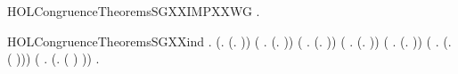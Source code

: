 \begin{SaveVerbatim}{HOLCongruenceTheoremsSGXXIMPXXWG}
\HOLTokenTurnstile{} \HOLSymConst{\HOLTokenForall{}}.   \HOLSymConst{\HOLTokenImp{}}  
\end{SaveVerbatim}
\newcommand{\HOLCongruenceTheoremsSGXXIMPXXWG}{\UseVerbatim{HOLCongruenceTheoremsSGXXIMPXXWG}}
\begin{SaveVerbatim}{HOLCongruenceTheoremsSGXXind}
\HOLTokenTurnstile{} \HOLSymConst{\HOLTokenForall{}}.
       (\HOLSymConst{\HOLTokenForall{}}.  (\HOLTokenLambda{}. )) \HOLSymConst{\HOLTokenConj{}}
       (\HOLSymConst{\HOLTokenForall{}} .   \HOLSymConst{\HOLTokenImp{}}  (\HOLTokenLambda{}.   )) \HOLSymConst{\HOLTokenConj{}}
       (\HOLSymConst{\HOLTokenForall{}} .   \HOLSymConst{\HOLTokenImp{}}  (\HOLTokenLambda{}.  )) \HOLSymConst{\HOLTokenConj{}}
       (\HOLSymConst{\HOLTokenForall{}} .   \HOLSymConst{\HOLTokenConj{}}   \HOLSymConst{\HOLTokenImp{}}  (\HOLTokenLambda{}.   \HOLSymConst{\ensuremath{+}}  )) \HOLSymConst{\HOLTokenConj{}}
       (\HOLSymConst{\HOLTokenForall{}} .   \HOLSymConst{\HOLTokenConj{}}   \HOLSymConst{\HOLTokenImp{}}  (\HOLTokenLambda{}.   \HOLSymConst{\ensuremath{\parallel}}  )) \HOLSymConst{\HOLTokenConj{}}
       (\HOLSymConst{\HOLTokenForall{}} .   \HOLSymConst{\HOLTokenImp{}}  (\HOLTokenLambda{}. \HOLConst{\ensuremath{\nu}}  ( ))) \HOLSymConst{\HOLTokenConj{}}
       (\HOLSymConst{\HOLTokenForall{}} .   \HOLSymConst{\HOLTokenImp{}}  (\HOLTokenLambda{}.  ( ) )) \HOLSymConst{\HOLTokenImp{}}
       \HOLSymConst{\HOLTokenForall{}}.   \HOLSymConst{\HOLTokenImp{}}  
\end{SaveVerbatim}
